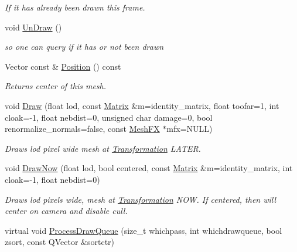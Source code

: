 \begin{DoxyCompactItemize}
\begin{DoxyCompactList}\small\item\em If it has already been drawn this frame. \end{DoxyCompactList}\item 
void \hyperlink{classMesh_a26a790a3fe05ba580f0ed134e90826ec}{Un\+Draw} ()\hypertarget{classMesh_a26a790a3fe05ba580f0ed134e90826ec}{}\label{classMesh_a26a790a3fe05ba580f0ed134e90826ec}

\begin{DoxyCompactList}\small\item\em so one can query if it has or not been drawn \end{DoxyCompactList}\item 
Vector const \& \hyperlink{classMesh_a41fa0e804cb6f15141080c1b1ffd4214}{Position} () const \hypertarget{classMesh_a41fa0e804cb6f15141080c1b1ffd4214}{}\label{classMesh_a41fa0e804cb6f15141080c1b1ffd4214}

\begin{DoxyCompactList}\small\item\em Returns center of this mesh. \end{DoxyCompactList}\item 
void \hyperlink{classMesh_a951d49f48a9fa1a4ef287373eb5d0425}{Draw} (float lod, const \hyperlink{classMatrix}{Matrix} \&m=identity\+\_\+matrix, float toofar=1, int cloak=-\/1, float nebdist=0, unsigned char damage=0, bool renormalize\+\_\+normals=false, const \hyperlink{classMeshFX}{Mesh\+FX} $\ast$mfx=N\+U\+LL)
\begin{DoxyCompactList}\small\item\em Draws lod pixel wide mesh at \hyperlink{structTransformation}{Transformation} L\+A\+T\+ER. \end{DoxyCompactList}\item 
void \hyperlink{classMesh_ae4029861af0ac80167bf22b2ddc8ee81}{Draw\+Now} (float lod, bool centered, const \hyperlink{classMatrix}{Matrix} \&m=identity\+\_\+matrix, int cloak=-\/1, float nebdist=0)\hypertarget{classMesh_ae4029861af0ac80167bf22b2ddc8ee81}{}\label{classMesh_ae4029861af0ac80167bf22b2ddc8ee81}

\begin{DoxyCompactList}\small\item\em Draws lod pixels wide, mesh at \hyperlink{structTransformation}{Transformation} N\+OW. If centered, then will center on camera and disable cull. \end{DoxyCompactList}\item 
virtual void \hyperlink{classMesh_aa35dc50ae01f25282d7a58e24972f80f}{Process\+Draw\+Queue} (size\+\_\+t whichpass, int whichdrawqueue, bool zsort, const Q\+Vector \&sortctr)\hypertarget{classMesh_aa35dc50ae01f25282d7a58e24972f80f}{}\label{classMesh_aa35dc50ae01f25282d7a58e24972f80f}


\end{DoxyCompactItemize}
